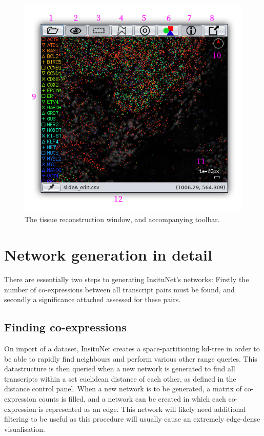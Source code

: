 \documentclass[a4paper,12pt]{article}
\begin{document}
\begin{figure}[htb]
	\caption{The tissue reconstruction window, and accompanying toolbar.}\label{fig:recon_details}
	\centering
	\includegraphics[width=\textwidth]{recon_details-shadow}
\end{figure}


\section{Network generation in detail}
There are essentially two steps to generating InsituNet's networks: Firstly the number of co-expressions between all transcript pairs must be found, and secondly a significance attached assessed for these pairs.

\subsection{Finding co-expressions}
On import of a dataset, InsituNet creates a space-partitioning kd-tree in order to be able to rapidly find neighbours and perform various other range queries. This datastructure is then queried when a new network is generated to find all transcripts within a set euclidean distance of each other, as defined in the distance control panel. When a new network is to be generated, a matrix of co-expression counts is filled, and a network can be created in which each co-expression is represented as an edge. This network will likely need additional filtering to be useful as this procedure will usually cause an extremely edge-dense visualisation.
\end{document}
